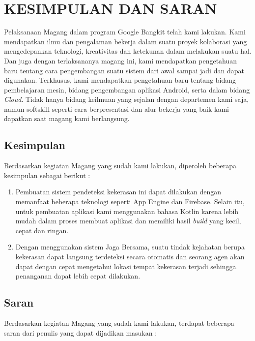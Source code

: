 \chapter{KESIMPULAN DAN SARAN}

Pelaksanaan Magang dalam program Google Bangkit telah kami lakukan. Kami mendapatkan ilmu dan pengalaman bekerja dalam suatu proyek kolaborasi yang mengedepankan teknologi, kreativitas dan ketekunan dalam melakukan suatu hal. Dan juga dengan terlaksananya magang ini, kami mendapatkan pengetahuan baru tentang cara pengembangan suatu sistem dari awal sampai jadi dan dapat digunakan. Terkhusus, kami mendapatkan pengetahuan baru tentang bidang pembelajaran mesin, bidang pengembangan aplikasi Android, serta dalam bidang \textit{Cloud}. Tidak hanya bidang keilmuan yang sejalan dengan departemen kami saja, namun softskill seperti cara berpresentasi dan alur bekerja yang baik kami dapatkan saat magang kami berlangsung.

\section{Kesimpulan}

Berdasarkan kegiatan Magang yang sudah kami lakukan, diperoleh beberapa kesimpulan sebagai berikut :

\begin{enumerate}[nolistsep]

  \item Pembuatan sistem pendeteksi kekerasan ini dapat dilakukan dengan memanfaat beberapa teknologi seperti App Engine dan Firebase. Selain itu, untuk pembuatan aplikasi kami menggunakan bahasa Kotlin karena lebih mudah dalam proses membuat aplikasi dan memiliki hasil \textit{build} yang kecil, cepat dan ringan.

  \item Dengan menggunakan sistem Jaga Bersama, suatu tindak kejahatan berupa kekerasan dapat langsung terdeteksi secara otomatis dan seorang agen akan dapat dengan cepat mengetahui lokasi tempat kekerasan terjadi sehingga penanganan dapat lebih cepat dilakukan.

\end{enumerate}

\section{Saran}

Berdasarkan kegiatan Magang yang sudah kami lakukan, terdapat beberapa saran dari penulis yang dapat dijadikan masukan :

